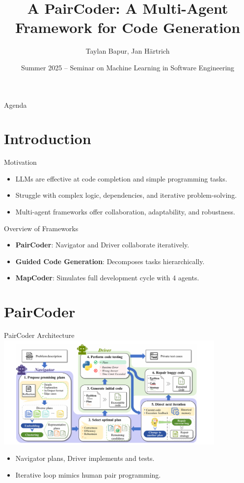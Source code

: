 \documentclass{beamer}
\title{A PairCoder: A Multi-Agent Framework for Code Generation}
\author{Taylan Bapur, Jan H\"artrich}
\date{Summer 2025 -- Seminar on Machine Learning in Software Engineering}
\begin{document}
	
	\begin{frame}
	  \titlepage
	\end{frame}
	
	\begin{frame}{Agenda}
	  \tableofcontents
	\end{frame}
	
	\section{Introduction}
	\begin{frame}{Motivation}
	  \begin{itemize}
	    \item LLMs are effective at code completion and simple programming tasks.
	    \item Struggle with complex logic, dependencies, and iterative problem-solving.
	    \item Multi-agent frameworks offer collaboration, adaptability, and robustness.
	  \end{itemize}
	\end{frame}
	
	\begin{frame}{Overview of Frameworks}
	  \begin{itemize}
	    \item \textbf{PairCoder}: Navigator and Driver collaborate iteratively.
	    \item \textbf{Guided Code Generation}: Decomposes tasks hierarchically.
	    \item \textbf{MapCoder}: Simulates full development cycle with 4 agents.
	  \end{itemize}
	\end{frame}
	
	\section{PairCoder}
	\begin{frame}{PairCoder Architecture}
	  \includegraphics[width=0.85\textwidth]{paircoder-architecture.png}
	  \begin{itemize}
	    \item Navigator plans, Driver implements and tests.
	    \item Iterative loop mimics human pair programming.
	  \end{itemize}
	\end{frame}
	
\end{document}
